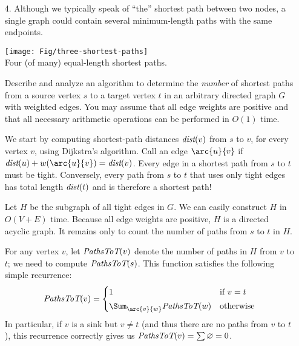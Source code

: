 \documentclass[11pt]{article}
\begin{document}
\begin{enumerate}
\Hard
\item[4.]
Although we typically speak of “the” shortest path between two nodes, a single graph could  contain several minimum-length paths with the same endpoints.

\begin{center}\footnotesize\sffamily
\texttt{[image: Fig/three-shortest-paths]}\\
Four (of many) equal-length shortest paths.
\end{center}

Describe and analyze an algorithm to determine the \emph{number} of shortest paths from a source vertex $s$ to a target vertex $t$ in an arbitrary directed graph $G$ with weighted edges.  You may assume that all edge weights are positive and that all necessary arithmetic operations can be performed in $O(1)$ time.



\begin{solution}
We start by computing shortest-path distances $\emph{dist}(v)$ from $s$ to $v$, for every vertex $v$, using Dijkstra’s algorithm.  Call an edge $\arc{u}{v}$  if $\emph{dist}(u) + w(\arc{u}{v}) = \emph{dist}(v)$.  Every edge in a shortest path from $s$ to $t$ must be tight.  Conversely, every path from $s$ to $t$ that uses only tight edges has total length $\emph{dist}(t)$ and is therefore a shortest path!

Let $H$ be the subgraph of all tight edges in $G$.  We can easily construct $H$ in $O(V+E)$ time.  Because all edge weights are positive, $H$ is a directed acyclic graph.  It remains only to count the number of paths from $s$ to $t$ in $H$.

For any vertex $v$, let $\emph{PathsToT}(v)$ denote the number of paths in $H$ from $v$ to $t$; we need to compute $\emph{PathsToT}(s)$.  This function satisfies the following simple recurrence:
\[
	\emph{PathsToT}(v) =
	\begin{cases}
		1 & \text{if $v = t$}\\[0.5ex]
		\displaystyle \Sum_{\arc{v}{w}}^{~} \emph{PathsToT}(w) & \text{otherwise}
	\end{cases}
\]
In particular, if $v$ is a sink but $v\ne t$ (and thus there are no paths from $v$ to $t$), this recurrence correctly gives us $\emph{PathsToT}(v) = \sum\varnothing = 0$.


\end{solution}
\end{enumerate}
\end{document}
